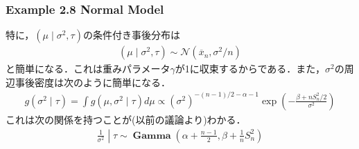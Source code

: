 \documentclass[dvipdfmx,cjk]{beamer}
\theoremstyle{example}
\DeclareMathOperator{\Gam}{\mathbf{Gamma}}
\begin{document}
\begin{frame}
    \frametitle{Example 2.8 Normal Model}
    特に，$(\mu\mid\sigma^2,\tau)$の条件付き事後分布は
    \begin{align*}
        (\mu\mid\sigma^2,\tau)\sim\mathcal{N}\left(\overline{x}_n,\sigma^2/n\right)
    \end{align*}
    と簡単になる．これは重みパラメータ$\gamma$が1に収束するからである．また，$\sigma^2$の周辺事後密度は次のように簡単になる．
    \begin{align*}
        g(\sigma^2\mid\tau)=\int g(\mu,\sigma^2\mid \tau)d\mu \propto (\sigma^2)^{-(n-1)/2-\alpha-1}\exp\left(-\frac{\beta+nS^2_n/2}{\sigma^2}\right)
    \end{align*}
    これは次の関係を持つことが(以前の議論より)わかる．
    \begin{align*}
        \left.\frac{1}{\sigma^2}\middle|\right.\tau\sim\Gam(\alpha+\frac{n-1}{2},\beta+\frac{1}{n}S^2_n)
    \end{align*}
\end{frame}

\end{document}
